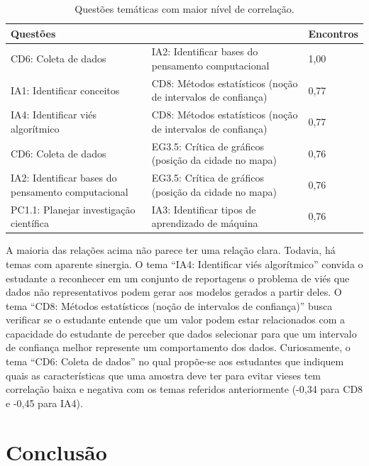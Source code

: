\documentclass[
]{book}
\begin{document}
\begin{table}

\caption{\label{tab:quadroimpacto5}Questões temáticas com maior nível de correlação.}
\centering
\begin{tabular}[t]{l|l|l}
\hline
Questões &  & Encontros\\
\hline
CD6: Coleta de dados & IA2: Identificar bases do pensamento computacional & 1,00\\
\hline
IA1: Identificar conceitos & CD8: Métodos estatísticos (noção de intervalos de confiança) & 0,77\\
\hline
IA4: Identificar viés algorítmico & CD8: Métodos estatísticos (noção de intervalos de confiança) & 0,77\\
\hline
CD6: Coleta de dados & EG3.5: Crítica de gráficos (posição da cidade no mapa) & 0,76\\
\hline
IA2: Identificar bases do pensamento computacional & EG3.5: Crítica de gráficos (posição da cidade no mapa) & 0,76\\
\hline
PC1.1: Planejar investigação científica & IA3: Identificar tipos de aprendizado de máquina & 0,76\\
\hline
\end{tabular}
\end{table}

A maioria das relações acima não parece ter uma relação clara. Todavia, há temas com aparente sinergia. O tema ``IA4: Identificar viés algorítmico'' convida o estudante a reconhecer em um conjunto de reportagens o problema de viés que dados não representativos podem gerar aos modelos gerados a partir deles. O tema ``CD8: Métodos estatísticos (noção de intervalos de confiança)'' busca verificar se o estudante entende que um valor podem estar relacionados com a capacidade do estudante de perceber que dados selecionar para que um intervalo de confiança melhor represente um comportamento dos dados. Curiosamente, o tema ``CD6: Coleta de dados'' no qual propõe-se aos estudantes que indiquem quais as características que uma amostra deve ter para evitar vieses tem correlação baixa e negativa com os temas referidos anteriormente (-0,34 para CD8 e -0,45 para IA4).

\hypertarget{conclusuxe3o}{%
\section{Conclusão}\label{conclusuxe3o}}
\end{document}
